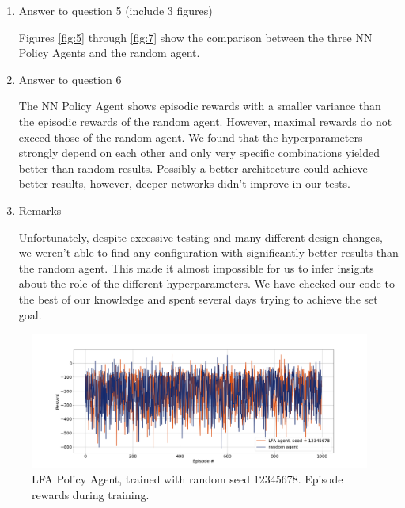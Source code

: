 \documentclass[11pt,a4paper]{article}
\begin{document}
\begin{enumerate}
\item Answer to question 5 (include 3 figures)

Figures \ref{fig:5} through \ref{fig:7} show the comparison between the three NN Policy Agents and the random agent.
	
\item Answer to question 6

The NN Policy Agent shows episodic rewards with a smaller variance than the episodic rewards of the random agent. However, maximal rewards do not exceed those of the random agent. We found that the hyperparameters strongly depend on each other and only very specific combinations yielded better than random results. Possibly a better architecture could achieve better results, however, deeper networks didn't improve in our tests.

\item Remarks

	Unfortunately, despite excessive testing and many different design changes, we weren't able to find any configuration with significantly better results than the random agent. This made it almost impossible for us to infer insights about the role of the different hyperparameters. We have checked our code to the best of our knowledge and spent several days trying to achieve the set goal.

\end{enumerate}


	\begin{figure}
	\begin{center}
		\includegraphics[width = 20cm]{12345678.png}
		\caption{LFA Policy Agent, trained with random seed 12345678. Episode rewards during training.}
		\label{fig:1}
	\end{center}
	\end{figure}
\end{document}
